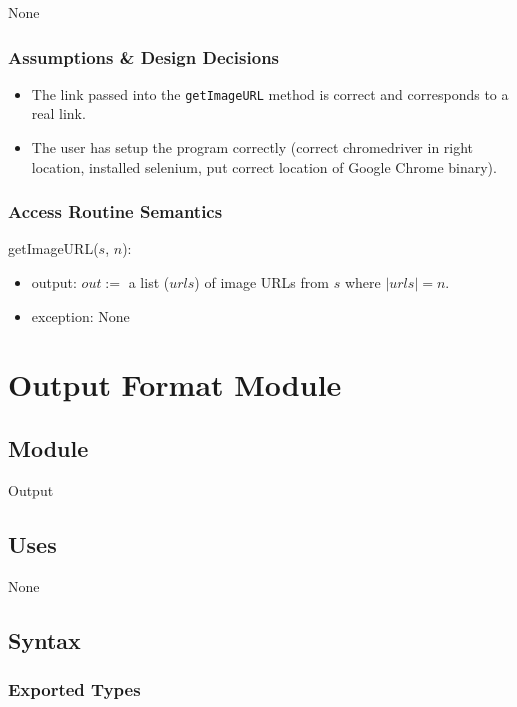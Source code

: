 \documentclass{article}
\begin{document}
None

\subsubsection* {Assumptions \& Design Decisions}

\begin{itemize}
\item The link passed into the \texttt{getImageURL} method is correct and corresponds to a real link.
\item The user has setup the program correctly (correct chromedriver in right location, installed selenium, put correct location of Google Chrome binary).

\end{itemize}

\subsubsection* {Access Routine Semantics}

\noindent getImageURL($s$, $n$):
\begin{itemize}
\item output: $\mathit{out} :=$ a list ($urls$) of image URLs from $s$ where $\mathit{|urls| = n}$.
\item exception: None
\end{itemize}

\newpage

\section*{Output Format Module}

\subsection* {Module}

Output

\subsection* {Uses}

None

\subsection* {Syntax}

\subsubsection* {Exported Types}
\end{document}
